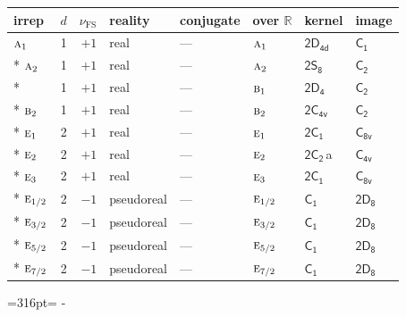 \documentclass[10pt,a4paper]{article}
\makeatletter
\def\grouprule#1#2{\noalign{\marks\LTgroupmarks{\the\belowrulesep}\nobreak\vskip#1%
  \vskip\aboverulesep}\multispan\LT@cols\unskip{\leaders\hrule\@height#2\hfill\kern\z@}\cr
  \noalign{\penalty\LTrulebreak\vskip\belowrulesep\global\@lastruleclass\z@}}
\newcommand{\needspace}[1]{\par\penalty-100\begingroup\dimen0=#1\relax\dimen2=\pagegoal
  \advance\dimen2-\pagetotal\ifdim\dimen0>\dimen2\relax\ifdim\dimen2>0pt\vfil\break\fi\fi
  \endgroup}
\numberwithin{equation}{section}
\newcommand{\grp}[1]{\mathsf{#1}}
\newcommand{\irr}[1]{\text{\normalfont\scshape #1}}
\newcommand{\detbox}[1]{{\setlength{\fboxsep}{1pt}\fbox{#1}}}
\newcommand{\clsletter}[1]{\,{\scriptsize\color{black!55}#1}}
\newcommand{\fsind}{\nu_{\mathrm{FS}}}
\makeatother
\begin{document}
\setlength{\emergencystretch}{2em}\par\setlength{\emergencystretch}{0pt}
{\small\renewcommand{\arraystretch}{1.25}\setlength{\tabcolsep}{4pt}\begin{longtable}{@{}lrrlllll@{}}\toprule
irrep & $d$ & $\fsind$ & reality & conjugate & over $\mathbb{R}$ & kernel & image\\\midrule\endhead
\bottomrule\endfoot\endlastfoot
$\irr{a}_{1}$ & 1 & $+1$ & real & --- & $\irr{a}_{1}$ & \href{2D4d.pdf}{$\grp{2D_{4d}}$} & \href{../../../rotation/data/pdf/C1.pdf}{$\grp{C_{1}}$}\\*
$\irr{a}_{2}$ & 1 & $+1$ & real & --- & $\irr{a}_{2}$ & \href{2S8.pdf}{$\grp{2S_{8}}$} & \href{../../../rotation/data/pdf/C2.pdf}{$\grp{C_{2}}$}\\*
\detbox{$\irr{b}_{1}$} & 1 & $+1$ & real & --- & $\irr{b}_{1}$ & \href{2D4.pdf}{$\grp{2D_{4}}$} & \href{../../../rotation/data/pdf/C2.pdf}{$\grp{C_{2}}$}\\*
$\irr{b}_{2}$ & 1 & $+1$ & real & --- & $\irr{b}_{2}$ & \href{2C4v.pdf}{$\grp{2C_{4v}}$} & \href{../../../rotation/data/pdf/C2.pdf}{$\grp{C_{2}}$}\\*
$\irr{e}_{1}$ & 2 & $+1$ & real & --- & $\irr{e}_{1}$ & \href{2C1.pdf}{$\grp{2C_{1}}$} & \href{../../../rotation/data/pdf/C8v.pdf}{$\grp{C_{8v}}$}\\*
$\irr{e}_{2}$ & 2 & $+1$ & real & --- & $\irr{e}_{2}$ & \href{2C2.pdf}{$\grp{2C_{2}}$}\clsletter{a} & \href{../../../rotation/data/pdf/C4v.pdf}{$\grp{C_{4v}}$}\\*
$\irr{e}_{3}$ & 2 & $+1$ & real & --- & $\irr{e}_{3}$ & \href{2C1.pdf}{$\grp{2C_{1}}$} & \href{../../../rotation/data/pdf/C8v.pdf}{$\grp{C_{8v}}$}\\*
\grouprule{0pt}{\lightrulewidth}
$\irr{e}_{1/2}$ & 2 & $-1$ & pseudoreal & --- & $\irr{e}_{1/2}$ & \href{C1.pdf}{$\grp{C_{1}}$} & \href{2D8.pdf}{$\grp{2D_{8}}$}\\*
$\irr{e}_{3/2}$ & 2 & $-1$ & pseudoreal & --- & $\irr{e}_{3/2}$ & \href{C1.pdf}{$\grp{C_{1}}$} & \href{2D8.pdf}{$\grp{2D_{8}}$}\\*
$\irr{e}_{5/2}$ & 2 & $-1$ & pseudoreal & --- & $\irr{e}_{5/2}$ & \href{C1.pdf}{$\grp{C_{1}}$} & \href{2D8.pdf}{$\grp{2D_{8}}$}\\*
$\irr{e}_{7/2}$ & 2 & $-1$ & pseudoreal & --- & $\irr{e}_{7/2}$ & \href{C1.pdf}{$\grp{C_{1}}$} & \href{2D8.pdf}{$\grp{2D_{8}}$}\\
\bottomrule\end{longtable}}
\needspace{316pt}
\end{document}
